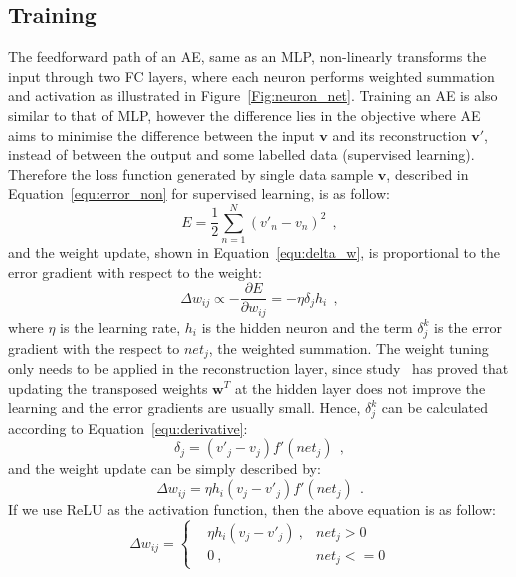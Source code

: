 \subsection{Training}
The feedforward path of an AE, same as an MLP, non-linearly transforms the input through two FC layers, where each neuron performs weighted summation and activation as illustrated in Figure~\ref{Fig:neuron_net}.
Training an AE is also similar to that of MLP, however the difference lies in the objective where AE aims to minimise the difference between the input $\mathbf{v}$ and its reconstruction $\mathbf{v'}$, instead of between the output and some labelled data (supervised learning).
Therefore the loss function generated by single data sample $\mathbf{v}$, described in Equation~\ref{equ:error_non} for supervised learning, is as follow:
\begin{equation}
E = \frac{1}{2}\sum_{n=1}^N (v'_{n}-v_{n})^{2}~~,
\end{equation}
and the weight update, shown in Equation~\ref{equ:delta_w}, is proportional to the error gradient with respect to the weight:
\begin{equation}
\Delta w_{ij} \propto -\frac{\partial E}{\partial w_{ij}} = -\eta \delta_j h_i~~,
\end{equation}
where $\eta$ is the learning rate, $h_i$ is the hidden neuron and the term $\delta^k_j$ is the error gradient with the respect to $net_j$, the weighted summation.
The weight tuning only needs to be applied in the reconstruction layer, since study~\cite{xu1993least} has proved that updating the transposed weights $\mathbf{w}^T$ at the hidden layer does not improve the learning and the error gradients are usually small.
Hence, $\delta^k_j$  can be calculated according to Equation~\ref{equ:derivative}:
\begin{equation}
\delta_j = (v'_{j}-v_{j}) f'(net_j)~~,
\end{equation}
and the weight update can be simply described by:
\begin{equation}
\Delta w_{ij} = \eta h_i (v_{j}-v'_{j})  f'(net_j)~~.
\end{equation}
If we use ReLU as the activation function, then the above equation is as follow:
\begin{equation}
\label{equ:ae_widrow_hoff}
\Delta w_{ij} = \left \{
\begin{aligned}
& \eta h_i(v_j - v'_j)~, & net_j > 0 \\
& 0~, & net_j < = 0
\end{aligned} 
\right.
\end{equation}

